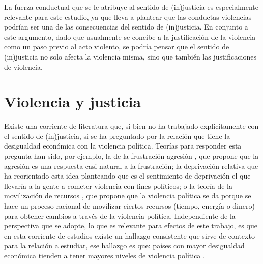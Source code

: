 \documentclass[12pt,twoside]{templates/facsothesis}
\begin{document}
La fuerza conductual que se le atribuye al sentido de (in)justicia es especialmente relevante para este estudio, ya que lleva a plantear que las conductas violencias podrían ser una de las consecuencias del sentido de (in)justicia. En conjunto a este argumento, dado que usualmente se concibe a la justificación de la violencia como un paso previo al acto violento, se podría pensar que el sentido de (in)justicia no solo afecta la violencia misma, sino que también las justificaciones de violencia.

\hypertarget{violencia-y-justicia}{%
\section{Violencia y justicia}\label{violencia-y-justicia}}

Existe una corriente de literatura que, si bien no ha trabajado explícitamente con el sentido de (in)justicia, si se ha preguntado por la relación que tiene la desigualdad económica con la violencia política. Teorías para responder esta pregunta han sido, por ejemplo, la de la frustración-agresión \citep{Dollard1939}, que propone que la agresión es una respuesta casi natural a la frustración; la deprivación relativa \citep{Gurr1970} que ha reorientado esta idea planteando que es el sentimiento de deprivación el que llevaría a la gente a cometer violencia con fines políticos; o la teoría de la movilización de recursos \citep{Tilly1981}, que propone que la violencia política se da porque se hace un proceso racional de movilizar ciertos recursos (tiempo, energía o dinero) para obtener cambios a través de la violencia política. Independiente de la perspectiva que se adopte, lo que es relevante para efectos de este trabajo, es que en esta corriente de estudios existe un hallazgo consistente que sirve de contexto para la relación a estudiar, ese hallazgo es que: países con mayor desigualdad económica tienden a tener mayores niveles de violencia política \citep{Ostby2013}.
\end{document}
